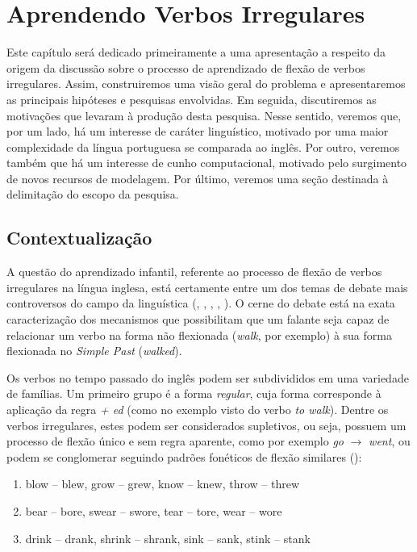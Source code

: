 \chapter{Aprendendo Verbos Irregulares}
\label{ch:01}

Este capítulo será dedicado primeiramente a uma apresentação a respeito da origem da discussão sobre o processo de aprendizado de flexão de verbos irregulares.  Assim, construiremos uma visão geral do problema e apresentaremos as principais hipóteses e pesquisas envolvidas. Em seguida, discutiremos as motivações que levaram à produção desta pesquisa. Nesse sentido, veremos que, por um lado, há um interesse de caráter linguístico, motivado por uma maior complexidade da língua portuguesa se comparada ao inglês. Por outro, veremos também que há um interesse de cunho computacional, motivado pelo surgimento de novos recursos de modelagem. Por último, veremos uma seção destinada à delimitação do escopo da pesquisa.

\section{Contextualização}
A questão do aprendizado infantil, referente ao processo de flexão de verbos irregulares na língua inglesa, está certamente entre um dos temas de debate mais controversos  
do campo da linguística (\cite{chomsky:1968}, \cite{Pinker:1999}, \cite{Pinker:1988}, \cite{Albright2003RulesVA}, \cite{kirov:2018}). O cerne do debate está na exata caracterização dos mecanismos que possibilitam que um falante seja capaz de relacionar um verbo na forma não flexionada (\textit{walk}, por exemplo) à sua forma flexionada no \textit{Simple Past} (\textit{walked}).

Os verbos no tempo passado do inglês podem ser subdivididos em uma variedade de famílias. Um primeiro grupo é a forma \textit{regular}, cuja forma corresponde à aplicação da regra \textit{ + ed} (como no exemplo visto do verbo \textit{to walk}). 
Dentre os verbos irregulares, estes podem ser considerados supletivos, ou seja, possuem um processo de flexão único e sem regra aparente, como por exemplo \textit{go} $\rightarrow$ \textit{went}, ou podem se conglomerar seguindo padrões fonéticos de flexão similares (\cite{Nelson:2010}):

\begin{enumerate}
    \item blow – blew, grow – grew, know – knew, throw – threw
    \item bear – bore, swear – swore, tear – tore, wear – wore
    \item drink – drank, shrink – shrank, sink – sank, stink – stank 
\end{enumerate}

